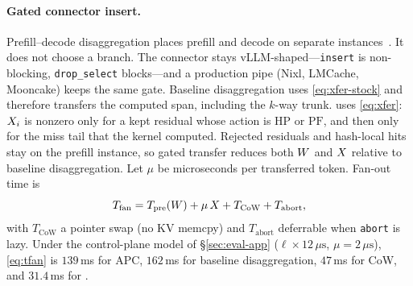 \paragraph{Gated connector insert.}
Prefill--decode disaggregation places prefill and decode on separate instances~\cite{distserve,splitwise}.
It does not choose a branch.
The connector stays vLLM-shaped---\texttt{insert} is non-blocking, \texttt{drop\_select} blocks---and a production pipe (Nixl, LMCache, Mooncake) keeps the same gate.
Baseline disaggregation uses \eqref{eq:xfer-stock} and therefore transfers the computed span, including the $k$-way trunk.
\app uses \eqref{eq:xfer}: $X_i$ is nonzero only for a kept residual whose action is $\mathrm{HP}$ or $\mathrm{PF}$, and then only for the miss tail that the kernel computed.
Rejected residuals and hash-local hits stay on the prefill instance, so gated transfer reduces both $W$ and $X$ relative to baseline disaggregation.
Let $\mu$ be microseconds per transferred token.
Fan-out time is
\begin{equation}
\label{eq:tfan}
T_{\mathrm{fan}}=T_{\mathrm{pre}}(W)+\mu\,X+T_{\mathrm{CoW}}+T_{\mathrm{abort}},
\end{equation}
with $T_{\mathrm{CoW}}$ a pointer swap (no KV memcpy) and $T_{\mathrm{abort}}$ deferrable when \texttt{abort} is lazy.
Under the control-plane model of \S\ref{sec:eval-app} ($\ell{\times}12\,\mu\mathrm{s}$, $\mu{=}2\,\mu\mathrm{s}$), \eqref{eq:tfan} is $139$\,ms for APC, $162$\,ms for baseline disaggregation, $47$\,ms for CoW, and $31.4$\,ms for \app.

